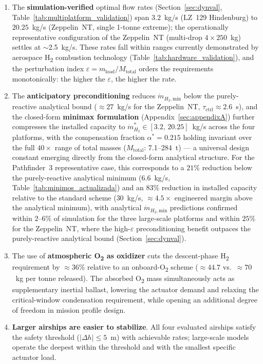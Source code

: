 \documentclass[applsci,article,submit,pdftex,moreauthors]{Definitions/mdpi}
\newcommand{\dotmmin}{\dot{m}_{H_2,\text{min}}}
\newcommand{\dotmstar}{\dot{m}_{H_2}^{*}}
\newcommand{\added}[1]{#1}
\newcommand{\addedR}[1]{\textcolor{green!60!black}{#1}}
\begin{document}
\begin{enumerate}
\item \addedR{The \textbf{simulation-verified} optimal flow rates (Section~\ref{sec:dynval}, Table~\ref{tab:multiplatform_validation}) span $3.2$~kg/s (LZ~129 Hindenburg) to $20.25$~kg/s (Zeppelin~NT, single 1-tonne extreme); the operationally representative configuration of the Zeppelin~NT (multi-drop $4\times250$~kg) settles at $\sim$2.5~kg/s. These rates fall within ranges currently demonstrated by aerospace H\textsubscript{2} combustion technology (Table~\ref{tab:hardware_validation}), and the perturbation index $\varepsilon = m_\text{load}/M_\text{total}$ orders the requirements monotonically: the higher the $\varepsilon$, the higher the rate.}
\item \addedR{The \textbf{anticipatory preconditioning} reduces $\dotmmin$ below the purely-reactive analytical bound (${\approx}27$~kg/s for the Zeppelin~NT, $\tau_\text{ctrl} \approx 2.6$~s), and the closed-form \textbf{minimax formulation} (Appendix~\ref{sec:appendixA}) further compresses the installed capacity to $\dotmstar \in [3.2,\,20.25]$~kg/s across the four platforms, with the compensation fraction $\alpha^* = 0.215$ holding invariant over the full $40\times$ range of total masses ($M_\text{total}$: 7.1--284~t) --- a universal design constant emerging directly from the closed-form analytical structure. For the Pathfinder~3 representative case, this corresponds to a $21\%$ reduction below the purely-reactive analytical minimum ($6.6$~kg/s, Table~\ref{tab:minimos_actualizada}) and an $83\%$ reduction in installed capacity relative to the standard scheme ($30$~kg/s, ${\approx}4.5\times$ engineered margin above the analytical minimum), with analytical $\dotmmin$ predictions confirmed within $2$--$6\%$ of simulation for the three large-scale platforms and within $25\%$ for the Zeppelin~NT, where the high-$\varepsilon$ preconditioning benefit outpaces the purely-reactive analytical bound (Section~\ref{sec:dynval}).}
\item \added{The use of \textbf{atmospheric O\textsubscript{2} as oxidizer} cuts the descent-phase H\textsubscript{2} requirement by ${\approx}36\%$ relative to an onboard-O\textsubscript{2} scheme (${\approx}44.7$ vs.\ ${\approx}70$~kg per tonne released). The absorbed O\textsubscript{2} mass simultaneously acts as supplementary inertial ballast, lowering the actuator demand and relaxing the critical-window condensation requirement, while opening an additional degree of freedom in mission profile design.}
\item \textbf{Larger airships are easier to stabilize}. All four evaluated airships satisfy the safety threshold ($|\Delta h| \le 5$~m) with achievable rates; large-scale models operate the deepest within the threshold and with the smallest specific actuator load.

\end{enumerate}
\end{document}
